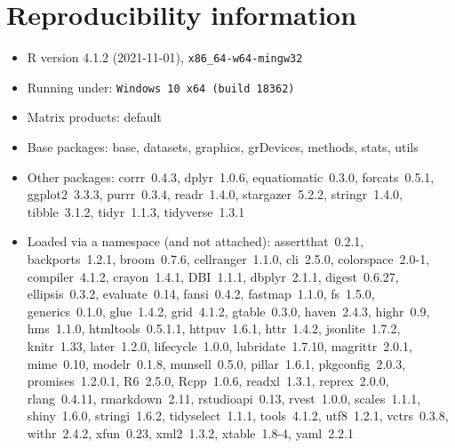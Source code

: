 \documentclass[
]{article}
\begin{document}
\hypertarget{reproducibility-information}{%
\section{Reproducibility
information}\label{reproducibility-information}}

\begin{itemize}\raggedright
  \item R version 4.1.2 (2021-11-01), \verb|x86_64-w64-mingw32|
  \item Running under: \verb|Windows 10 x64 (build 18362)|
  \item Matrix products: default
  \item Base packages: base, datasets, graphics, grDevices, methods,
    stats, utils
  \item Other packages: corrr~0.4.3, dplyr~1.0.6, equatiomatic~0.3.0,
    forcats~0.5.1, ggplot2~3.3.3, purrr~0.3.4, readr~1.4.0,
    stargazer~5.2.2, stringr~1.4.0, tibble~3.1.2, tidyr~1.1.3,
    tidyverse~1.3.1
  \item Loaded via a namespace (and not attached): assertthat~0.2.1,
    backports~1.2.1, broom~0.7.6, cellranger~1.1.0, cli~2.5.0,
    colorspace~2.0-1, compiler~4.1.2, crayon~1.4.1, DBI~1.1.1,
    dbplyr~2.1.1, digest~0.6.27, ellipsis~0.3.2, evaluate~0.14,
    fansi~0.4.2, fastmap~1.1.0, fs~1.5.0, generics~0.1.0, glue~1.4.2,
    grid~4.1.2, gtable~0.3.0, haven~2.4.3, highr~0.9, hms~1.1.0,
    htmltools~0.5.1.1, httpuv~1.6.1, httr~1.4.2, jsonlite~1.7.2,
    knitr~1.33, later~1.2.0, lifecycle~1.0.0, lubridate~1.7.10,
    magrittr~2.0.1, mime~0.10, modelr~0.1.8, munsell~0.5.0,
    pillar~1.6.1, pkgconfig~2.0.3, promises~1.2.0.1, R6~2.5.0,
    Rcpp~1.0.6, readxl~1.3.1, reprex~2.0.0, rlang~0.4.11,
    rmarkdown~2.11, rstudioapi~0.13, rvest~1.0.0, scales~1.1.1,
    shiny~1.6.0, stringi~1.6.2, tidyselect~1.1.1, tools~4.1.2,
    utf8~1.2.1, vctrs~0.3.8, withr~2.4.2, xfun~0.23, xml2~1.3.2,
    xtable~1.8-4, yaml~2.2.1
\end{itemize}
\end{document}
